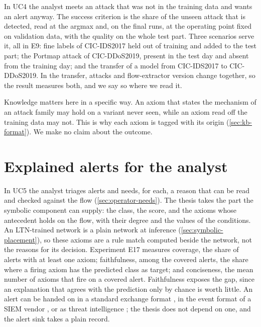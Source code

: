 In UC4 the analyst meets an attack that was not in the training data and wants an
alert anyway. The success criterion is the share of the unseen attack that is
detected, read at the argmax and, on the final runs, at the operating point fixed on
validation data, with the quality on the whole test part. Three scenarios serve it,
all in E9: fine labels of CIC-IDS2017 held out of training and added to the test
part; the Portmap attack of CIC-DDoS2019, present in the test day and absent from the
training day; and the transfer of a model from CIC-IDS2017 to CIC-DDoS2019. In the
transfer, attacks and flow-extractor version change together, so
the result measures both, and we say so where we read it.

Knowledge matters here in a specific way. An axiom that states the mechanism of an
attack family may hold on a variant never seen, while an axiom read off the
training data may not. This is why each axiom is tagged with its origin
(\cref{sec:kb-format}). We make no claim about the outcome.

\section{Explained alerts for the analyst}
\label{sec:uc5}

In UC5 the analyst triages alerts and needs, for each, a reason that can be read
and checked against the flow (\cref{sec:operator-needs}). The thesis takes the part
the symbolic component can supply: the class, the score, and the axioms whose
antecedent holds on the flow, with their degree and the values of the conditions.
An LTN-trained network is a plain network at inference
(\cref{sec:symbolic-placement}), so these axioms are a rule match computed beside
the network, not the reasons for its decision. Experiment E17 measures coverage,
the share of alerts with at least one axiom; faithfulness, among the covered alerts,
the share where a firing axiom has the predicted class as target; and conciseness, the
mean number of axioms that fire on a covered alert. Faithfulness exposes the gap, since an explanation that
agrees with the prediction only by chance is worth little. An alert can be handed on
in a standard exchange format \citep{debar2007rfc4765}, in the event format of a SIEM
vendor \citep{opentext2023cef}, or as threat intelligence \citep{jordan2021stix}; the
thesis does not depend on one, and the alert sink takes a plain record.

